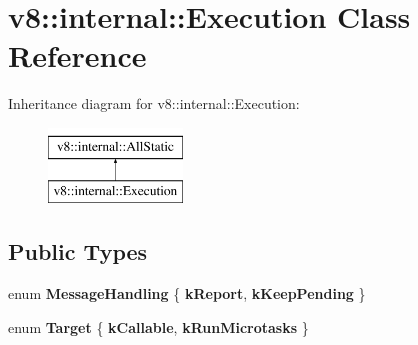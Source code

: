 \hypertarget{classv8_1_1internal_1_1Execution}{}\section{v8\+:\+:internal\+:\+:Execution Class Reference}
\label{classv8_1_1internal_1_1Execution}
Inheritance diagram for v8\+:\+:internal\+:\+:Execution\+:\begin{figure}[H]
\begin{center}
\leavevmode
\includegraphics[height=2.000000cm]{classv8_1_1internal_1_1Execution}
\end{center}
\end{figure}
\subsection*{Public Types}
\begin{DoxyCompactItemize}
\item 
\mbox{\label{classv8_1_1internal_1_1Execution_a50174c7bc266b3c1f85fe7058492e1cd}} 
enum {\bfseries Message\+Handling} \{ {\bfseries k\+Report}, 
{\bfseries k\+Keep\+Pending}
 \}
\item 
\mbox{\label{classv8_1_1internal_1_1Execution_abd0a3c50fee78c49442197402e6cec28}} 
enum {\bfseries Target} \{ {\bfseries k\+Callable}, 
{\bfseries k\+Run\+Microtasks}
 \}
\end{DoxyCompactItemize}
